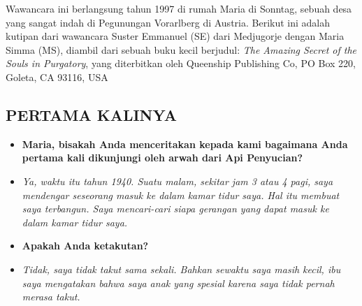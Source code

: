Wawancara ini berlangsung tahun 1997 di rumah Maria di Sonntag, sebuah desa yang sangat indah di Pegunungan Vorarlberg di Austria. Berikut ini adalah kutipan dari wawancara Suster Emmanuel (SE) dari Medjugorje dengan Maria Simma (MS), diambil dari sebuah buku kecil berjudul: \textit{The Amazing Secret of the Souls in Purgatory}, yang diterbitkan oleh Queenship Publishing Co, PO Box 220, Goleta, CA 93116, USA 



\subsection*{PERTAMA KALINYA}
\newcommand{\BSE}[1]{\begin{itemize} \item[SE:] \textbf{#1} \end{itemize}}
\newcommand{\BMS}[1]{\begin{itemize} \item[MS:] \textit{#1} \end{itemize}}

\BSE{Maria, bisakah Anda menceritakan kepada kami bagaimana Anda pertama kali dikunjungi oleh arwah dari Api Penyucian?} 
\BMS{Ya, waktu itu tahun 1940. Suatu malam, sekitar jam 3 atau 4 pagi, saya mendengar seseorang masuk ke dalam kamar tidur saya. Hal itu membuat saya terbangun. Saya mencari-cari siapa gerangan yang dapat masuk ke dalam kamar tidur saya.}

\BSE{Apakah Anda ketakutan?}
\BMS{Tidak, saya tidak takut sama sekali. Bahkan sewaktu saya masih kecil, ibu saya mengatakan bahwa saya anak yang spesial karena saya tidak pernah merasa takut.}

